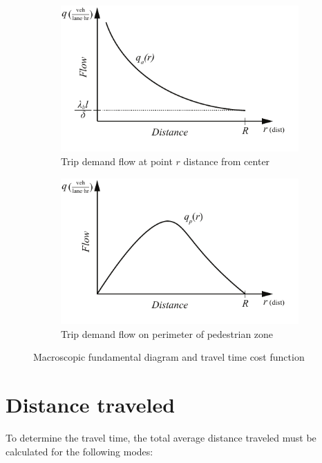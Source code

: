 \documentclass{article}
\begin{document}
\begin{figure}[!ht]
     \centering
     \hfill
     \begin{subfigure}[b]{0.45\textwidth}
         \centering
         \includegraphics[width=\textwidth]{diagram_flow_across}
         \caption{Trip demand flow at point $r$ distance from center}
         \label{fig:flowacross}
     \end{subfigure}
     \hfill
     \begin{subfigure}[b]{0.45\textwidth}
         \centering
         \includegraphics[width=\textwidth]{diagram_flow_perim}
         \caption{Trip demand flow on perimeter of pedestrian zone}
         \label{fig:perimflow}
     \end{subfigure}
     \hfill
     \caption{Macroscopic fundamental diagram and travel time cost function}
\end{figure}

\section{Distance traveled}
To determine the travel time, the total average distance traveled must be calculated for the following modes:
\end{document}
